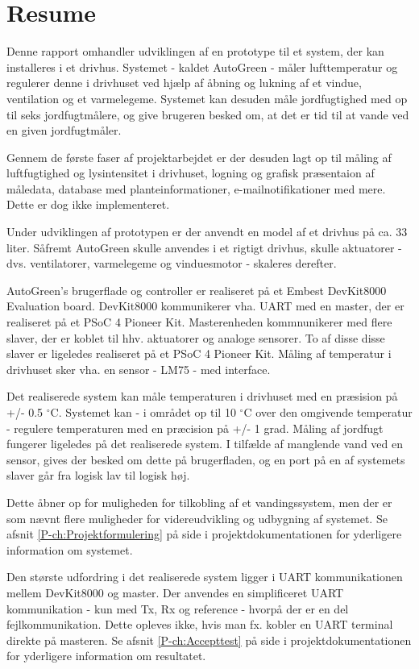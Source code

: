 \chapter{Resume}
\label{ch:Resume}

Denne rapport omhandler udviklingen af en prototype til et system, der kan installeres i et drivhus. 
Systemet - kaldet AutoGreen - måler lufttemperatur og regulerer denne i drivhuset ved hjælp af åbning og lukning af et vindue, ventilation og et varmelegeme. 
Systemet kan desuden måle jordfugtighed med op til seks jordfugtmålere, og give brugeren besked om, at det er tid til at vande ved en given jordfugtmåler. 

Gennem de første faser af projektarbejdet er der desuden lagt op til måling af luftfugtighed og lysintensitet i drivhuset, logning og grafisk præsentaion af måledata, database med planteinformationer, e-mailnotifikationer med mere. 
Dette er dog ikke implementeret. 

Under udviklingen af prototypen er der anvendt en model af et drivhus på ca. 33 liter. 
Såfremt AutoGreen skulle anvendes i et rigtigt drivhus, skulle aktuatorer - dvs. ventilatorer, varmelegeme og vinduesmotor - skaleres derefter.

AutoGreen's brugerflade og controller er realiseret på et Embest DevKit8000 Evaluation board\cite{lib:DK8000}.
DevKit8000 kommunikerer vha. UART med en \IIC master, der er realiseret på et PSoC 4 Pioneer Kit\cite{lib:psoc4_guide}. 
Masterenheden kommnunikerer med flere \IIC slaver, der er koblet til hhv. aktuatorer og analoge sensorer. 
To af disse disse \IIC slaver er ligeledes realiseret på et PSoC 4 Pioneer Kit. 
Måling af temperatur i drivhuset sker vha. en sensor - LM75 - med \IIC interface\cite{lib:LM75}. 

Det realiserede system kan måle temperaturen i drivhuset med en præsision på +/- 0.5 $^{\circ}$C. 
Systemet kan - i området op til 10 $^{\circ}$C over den omgivende temperatur - regulere temperaturen med en præcision på +/- 1 grad. 
Måling af jordfugt fungerer ligeledes på det realiserede system. 
I tilfælde af manglende vand ved en sensor, gives der besked om dette på brugerfladen, og en port på en af systemets \IIC slaver går fra logisk lav til logisk høj.

Dette åbner op for muligheden for tilkobling af et vandingssystem, men der er som nævnt flere muligheder for videreudvikling og udbygning af systemet. Se afsnit \ref{P-ch:Projektformulering}  på side \pageref{P-ch:Projektformulering} i projektdokumentationen for yderligere information om systemet. 

Den største udfordring i det realiserede system ligger i UART kommunikationen mellem DevKit8000 og \IIC master. 
Der anvendes en simplificeret UART kommunikation - kun med Tx, Rx og reference - hvorpå der er en del fejlkommunikation. 
Dette opleves ikke, hvis man fx. kobler en UART terminal direkte på \IIC masteren. 
Se afsnit \ref{P-ch:Accepttest}  på side \pageref{P-ch:Accepttest} i projektdokumentationen for yderligere information om resultatet.

\clearpage